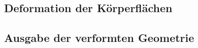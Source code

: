\subsection{Deformation der Körperflächen}

\subsection{Ausgabe der verformten Geometrie}





           


       

        








    













  
